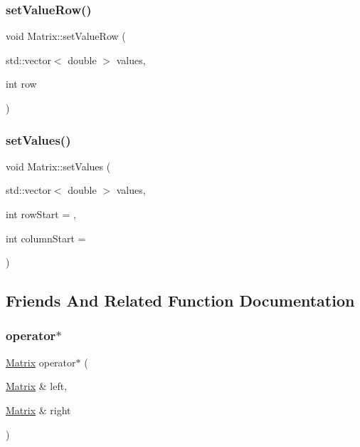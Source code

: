 \mbox{\label{classMatrix_a0c70a6fc13e5b41d473bcdde7af1da11}} 
\subsubsection{\texorpdfstring{set\+Value\+Row()}{setValueRow()}}
{\footnotesize\ttfamily void Matrix\+::set\+Value\+Row (\begin{DoxyParamCaption}\item[{std\+::vector$<$ double $>$}]{values,  }\item[{int}]{row }\end{DoxyParamCaption})}

\mbox{\label{classMatrix_a14c65630cbfab56ef5a99c793cca3dba}} 
\subsubsection{\texorpdfstring{set\+Values()}{setValues()}}
{\footnotesize\ttfamily void Matrix\+::set\+Values (\begin{DoxyParamCaption}\item[{std\+::vector$<$ double $>$}]{values,  }\item[{int}]{row\+Start = {},  }\item[{int}]{column\+Start = {} }\end{DoxyParamCaption})}



\subsection{Friends And Related Function Documentation}
\mbox{\label{classMatrix_ac50600b8a22de241095a6d5fd075acc5}} 
\subsubsection{\texorpdfstring{operator$\ast$}{operator*}}
{\footnotesize\ttfamily \hyperlink{classMatrix}{Matrix} operator$\ast$ (\begin{DoxyParamCaption}\item[{\hyperlink{classMatrix}{Matrix} \&}]{left,  }\item[{\hyperlink{classMatrix}{Matrix} \&}]{right }\end{DoxyParamCaption})\hspace{0.3cm}{\ttfamily [friend]}}

